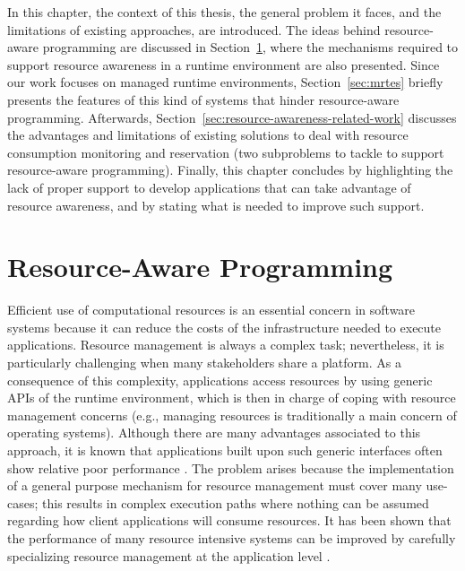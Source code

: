 In this chapter, the context of this thesis, the general problem it faces, and the limitations of existing approaches, are introduced.
The ideas behind resource-aware programming are discussed in Section~\ref{sec:resource-awareness},
where the mechanisms required to support resource awareness in a runtime environment are also presented.
Since our work focuses on managed runtime environments, Section~\ref{sec:mrtes} briefly presents the features of this kind of systems that hinder resource-aware programming.
Afterwards, Section~\ref{sec:resource-awareness-related-work} discusses the advantages and limitations of existing solutions to deal with resource consumption monitoring and reservation (two subproblems to tackle to support resource-aware programming).
Finally, this chapter concludes by highlighting the lack of proper support to develop applications that can take advantage of resource awareness, and by stating what is needed to improve such support.

\section{Resource-Aware Programming} \label{sec:resource-awareness}

Efficient use of computational resources is an essential concern in software systems because it can reduce the costs of the infrastructure needed to execute applications.
Resource management is always a complex task; nevertheless, it is particularly challenging when many stakeholders share a platform.
As a consequence of this complexity, applications access resources by using generic APIs of the runtime environment, which is then in charge of coping with resource management concerns (e.g., managing resources is traditionally a main concern of operating systems).
Although there are many advantages associated to this approach, it is known that applications built upon such generic interfaces often show relative poor performance \cite{engler1995exokernel}.
The problem arises because the implementation of a general purpose mechanism for resource management must cover many use-cases; this results in complex execution paths where nothing can be assumed regarding how client applications will consume resources.
It has been shown that the performance of many resource intensive systems can be improved by carefully specializing resource management at the application level \cite{engler1995exokernel,Belay:2014:IPD:2685048.2685053,Marinos:2014:NSS:2619239.2626311}.

